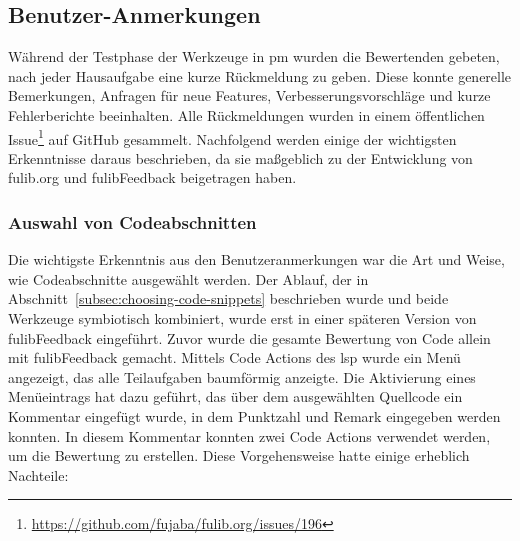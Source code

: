 \subsection{Benutzer-Anmerkungen}\label{subsec:user-feedback}

Während der Testphase der Werkzeuge in \ac{pm} wurden die Bewertenden gebeten, nach jeder Hausaufgabe eine kurze Rückmeldung zu geben.
Diese konnte generelle Bemerkungen, Anfragen für neue Features, Verbesserungsvorschläge und kurze Fehlerberichte beeinhalten.
Alle Rückmeldungen wurden in einem öffentlichen Issue\footnote{
    \url{https://github.com/fujaba/fulib.org/issues/196}
} auf GitHub gesammelt.
Nachfolgend werden einige der wichtigsten Erkenntnisse daraus beschrieben, da sie maßgeblich zu der Entwicklung von fulib.org und fulibFeedback beigetragen haben.

\subsubsection{Auswahl von Codeabschnitten}

Die wichtigste Erkenntnis aus den Benutzeranmerkungen war die Art und Weise, wie Codeabschnitte ausgewählt werden.
Der Ablauf, der in Abschnitt~\ref{subsec:choosing-code-snippets} beschrieben wurde und beide Werkzeuge symbiotisch kombiniert, wurde erst in einer späteren Version von fulibFeedback eingeführt.
Zuvor wurde die gesamte Bewertung von Code allein mit fulibFeedback gemacht.
Mittels Code Actions des \ac{lsp} wurde ein Menü angezeigt, das alle Teilaufgaben baumförmig anzeigte.
Die Aktivierung eines Menüeintrags hat dazu geführt, das über dem ausgewählten Quellcode ein Kommentar eingefügt wurde, in dem Punktzahl und Remark eingegeben werden konnten.
In diesem Kommentar konnten zwei Code Actions verwendet werden, um die Bewertung zu erstellen.
Diese Vorgehensweise hatte einige erheblich Nachteile:


